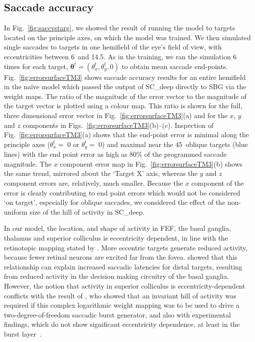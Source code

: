 \documentclass{frontiersSCNS}
\begin{document}
\subsection{Saccade accuracy} \label{sec:results:accuracy}

In Fig.~\ref{fig:saccvstarg}, we showed the result of running the model
to targets located on the principle axes, on which the model was
trained. We then simulated single saccades to targets in one hemifield
of the eye's field of view, with eccentricities between 6\dg~and
14.5\dg. As in the training, we ran the simulation 6 times for each
target, $\mathbf{\theta}^t = (\theta_{x}^t, \theta_{y}^t, 0)$ to
obtain mean saccade end-points.  Fig.~\ref{fig:errorsurfaceTM3} shows
saccade accuracy results for an entire hemifield in the na\"ive model
which passed the output of SC\_deep directly to SBG via the weight
maps. The ratio of the magnitude of the error vector to the magnitude
of the target vector is plotted using a colour map. This ratio is
shown for the full, three dimensional error vector in
Fig.~\ref{fig:errorsurfaceTM3}(a) and for the $x$, $y$ and $z$ components
in Figs.~\ref{fig:errorsurfaceTM3}(b)--(c).  Inspection of
Fig.~\ref{fig:errorsurfaceTM3}(a) shows that the end-point error is
minimal along the principle axes ($\theta_{x}^t=\;$0 or
$\theta_{y}^t=\;$0) and maximal near the 45\dg~oblique targets (blue
lines) with the end point error as high as 80\% of the programmed
saccade magnitude.  The $x$ component error map in
Fig.~\ref{fig:errorsurfaceTM3}(b) shows the same trend, mirrored about the
`Target X' axis, whereas the $y$ and $z$ component errors are,
relatively, much smaller.  Because the $x$ component of the error is
clearly contributing to end point errors which would not be considered
`on target', especially for oblique saccades, we considered the effect
of the non-uniform size of the hill of activity in SC\_deep.

In our model, the location,  and shape of activity in FEF, the
basal ganglia, thalamus and superior colliculus is eccentricity
dependent, in line with the retinotopic mapping stated by
\cite{ottes_visuomotor_1986}. More eccentric targets generate reduced
activity, because fewer retinal neurons are excited far from the
fovea. \cite{cope_basal_2017} showed that this relationship can
explain increased saccadic latencies for distal targets, resulting
from reduced activity in the decision making circuitry of the basal
ganglia.  However, the notion that activity in superior colliculus is
eccentricity-dependent conflicts with the result of
\cite{tabareau_geometry_2007}, who showed
that an invariant hill of activity was required if this complex
logarithmic weight mapping was to be used to drive a
two-degree-of-freedom saccadic burst generator, and also with
experimental findings, which do not show significant eccentricity
dependence, at least in the burst
layer~\citep{anderson_two-dimensional_1998}.
\end{document}
